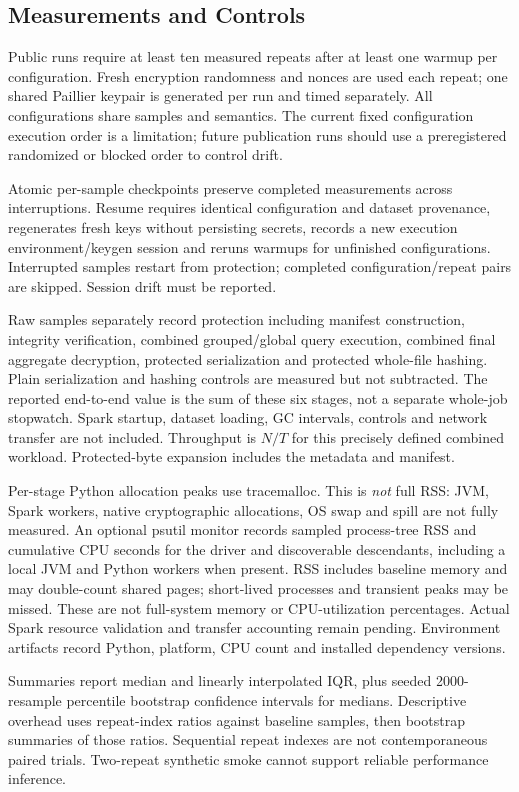 \documentclass[conference]{IEEEtran}
\begin{document}
\subsection{Measurements and Controls}
Public runs require at least ten measured repeats after at least one warmup per configuration. Fresh encryption randomness and nonces are used each repeat; one shared Paillier keypair is generated per run and timed separately. All configurations share samples and semantics. The current fixed configuration execution order is a limitation; future publication runs should use a preregistered randomized or blocked order to control drift.

Atomic per-sample checkpoints preserve completed measurements across interruptions. Resume requires identical configuration and dataset provenance, regenerates fresh keys without persisting secrets, records a new execution environment/keygen session and reruns warmups for unfinished configurations. Interrupted samples restart from protection; completed configuration/repeat pairs are skipped. Session drift must be reported.

Raw samples separately record protection including manifest construction, integrity verification, combined grouped/global query execution, combined final aggregate decryption, protected serialization and protected whole-file hashing. Plain serialization and hashing controls are measured but not subtracted. The reported end-to-end value is the sum of these six stages, not a separate whole-job stopwatch. Spark startup, dataset loading, GC intervals, controls and network transfer are not included. Throughput is $N/T$ for this precisely defined combined workload. Protected-byte expansion includes the metadata and manifest.

Per-stage Python allocation peaks use tracemalloc. This is \emph{not} full RSS: JVM, Spark workers, native cryptographic allocations, OS swap and spill are not fully measured. An optional psutil monitor records sampled process-tree RSS and cumulative CPU seconds for the driver and discoverable descendants, including a local JVM and Python workers when present. RSS includes baseline memory and may double-count shared pages; short-lived processes and transient peaks may be missed. These are not full-system memory or CPU-utilization percentages. Actual Spark resource validation and transfer accounting remain pending. Environment artifacts record Python, platform, CPU count and installed dependency versions.

Summaries report median and linearly interpolated IQR, plus seeded 2000-resample percentile bootstrap confidence intervals for medians. Descriptive overhead uses repeat-index ratios against baseline samples, then bootstrap summaries of those ratios. Sequential repeat indexes are not contemporaneous paired trials. Two-repeat synthetic smoke cannot support reliable performance inference.
\end{document}
